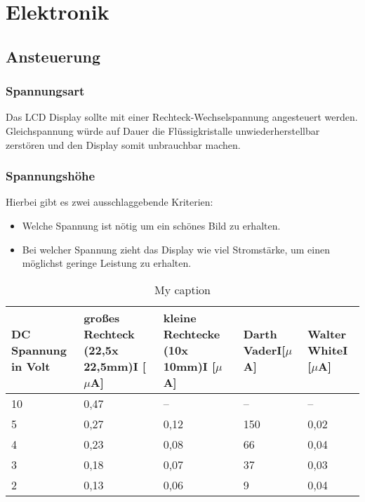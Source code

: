 \section{Elektronik}\label{sec:elektronik}
\subsection{Ansteuerung}
\subsubsection{Spannungsart}
Das LCD Display sollte mit einer Rechteck-Wechselspannung angesteuert werden. Gleichspannung würde auf Dauer die Flüssigkristalle unwiederherstellbar zerstören und den Display somit unbrauchbar machen.
\subsubsection{Spannungshöhe}\label{subsec:spannung}
Hierbei gibt es zwei ausschlaggebende Kriterien:
\begin{itemize}
\item Welche Spannung ist nötig um ein schönes Bild zu erhalten.
\item Bei welcher Spannung zieht das Display wie viel Stromstärke, um einen möglichst geringe Leistung zu erhalten.
\end{itemize}
\begin{table}[]
	\centering
	\caption{My caption}
	\label{my-label}
	\begin{tabular}{p{1cm}|p{1cm}|p{1cm}|p{1cm}|p{1cm}}
		\toprule
		DC Spannung in Volt      & großes Rechteck (22,5x 22,5mm)I {[}$\mu$A{]} & kleine Rechtecke (10x 10mm)I {[}$\mu$A{]} & Darth VaderI{[}$\mu$A{]}     & Walter WhiteI {[}$\mu$A{]}    \\ \midrule
		\multicolumn{1}{|l|}{10} & \multicolumn{1}{l|}{0,47}               & \multicolumn{1}{l|}{--}              & \multicolumn{1}{l|}{--}  & \multicolumn{1}{l|}{--}   \\ \midrule
		\multicolumn{1}{|l|}{5}  & \multicolumn{1}{l|}{0,27}               & \multicolumn{1}{l|}{0,12}            & \multicolumn{1}{l|}{150} & \multicolumn{1}{l|}{0,02} \\ \midrule
		\multicolumn{1}{|l|}{4}  & \multicolumn{1}{l|}{0,23}               & \multicolumn{1}{l|}{0,08}            & \multicolumn{1}{l|}{66}  & \multicolumn{1}{l|}{0,04} \\ \midrule
		\multicolumn{1}{|l|}{3}  & \multicolumn{1}{l|}{0,18}               & \multicolumn{1}{l|}{0,07}            & \multicolumn{1}{l|}{37}  & \multicolumn{1}{l|}{0,03} \\ \midrule
		\multicolumn{1}{|l|}{2}  & \multicolumn{1}{l|}{0,13}               & \multicolumn{1}{l|}{0,06}            & \multicolumn{1}{l|}{9}   & \multicolumn{1}{l|}{0,04} \\ \bottomrule
	\end{tabular}
	\label{tab:volt}
\end{table}


